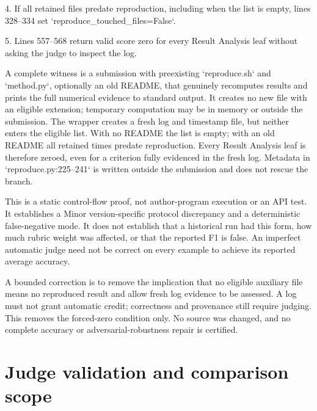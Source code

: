 \documentclass[10pt]{article}
\begin{document}
4. If all retained files predate reproduction, including when the list is empty, lines 328–334 set `reproduce\_touched\_files=False`.\par
5. Lines 557–568 return valid score zero for every Result Analysis leaf without asking the judge to inspect the log.\par
A complete witness is a submission with preexisting `reproduce.sh` and `method.py`, optionally an old README, that genuinely recomputes results and prints the full numerical evidence to standard output. It creates no new file with an eligible extension; temporary computation may be in memory or outside the submission. The wrapper creates a fresh log and timestamp file, but neither enters the eligible list. With no README the list is empty; with an old README all retained times predate reproduction. Every Result Analysis leaf is therefore zeroed, even for a criterion fully evidenced in the fresh log. Metadata in `reproduce.py:225--241` is written outside the submission and does not rescue the branch.\par
This is a static control-flow proof, not author-program execution or an API test. It establishes a Minor version-specific protocol discrepancy and a deterministic false-negative mode. It does not establish that a historical run had this form, how much rubric weight was affected, or that the reported F1 is false. An imperfect automatic judge need not be correct on every example to achieve its reported average accuracy.\par
A bounded correction is to remove the implication that no eligible auxiliary file means no reproduced result and allow fresh log evidence to be assessed. A log must not grant automatic credit; correctness and provenance still require judging. This removes the forced-zero condition only. No source was changed, and no complete accuracy or adversarial-robustness repair is certified.\par
\section*{Judge validation and comparison scope}
\end{document}

